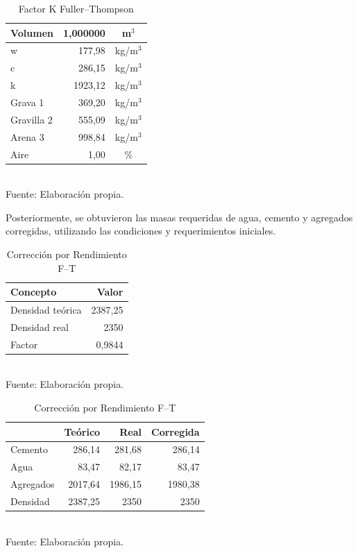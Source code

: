 \begin{table}[H]
\centering
\caption{Factor K Fuller--Thompson}
\label{tab:factor-k-thomson}
\setlength{\tabcolsep}{6pt}
\renewcommand{\arraystretch}{1.15}
\small
\begin{tabular}{|l|r|c|}
\hline
\textbf{Volumen} & \textbf{1,000000} & \textbf{m$^{3}$} \\ \hline
w          & 177,98     & kg/m$^{3}$ \\ \hline
c          & 286,15     & kg/m$^{3}$ \\ \hline
k          & 1923,12    & kg/m$^{3}$ \\ \hline
Grava 1    & 369,20     & kg/m$^{3}$ \\ \hline
Gravilla 2 & 555,09     & kg/m$^{3}$ \\ \hline
Arena 3    & 998,84     & kg/m$^{3}$ \\ \hline
Aire & 1,00 & \% \\ \hline
\end{tabular}
\\ Fuente: Elaboración propia.
\end{table}

Posteriormente, se obtuvieron las masas requeridas de agua, cemento y agregados corregidas, utilizando las
condiciones y requerimientos iniciales.

\begin{table}[H]
\centering
\caption{Rendimiento Fuller-Thompson y factor de densidad}
\label{tab:rendimiento-factor-thomson}
\small
\setlength{\tabcolsep}{6pt}
\renewcommand{\arraystretch}{1.15}
\begin{subtable}[t]{0.38\textwidth}
\centering
\caption{Densidades}
\begin{tabular}{lr}
\toprule
\textbf{Concepto} & \textbf{Valor} \\
\midrule
Densidad teórica & 2387,25 \\
Densidad real    & 2350 \\
Factor           & 0,9844 \\
\bottomrule
\end{tabular}
\\ Fuente: Elaboración propia.
\end{subtable}
\hfill
\begin{subtable}[t]{0.58\textwidth}
\centering
\caption{Corrección por Rendimiento F--T}
\setlength{\tabcolsep}{6pt}
\renewcommand{\arraystretch}{1.15}
\small
\begin{tabular}{lrrr}
\toprule
 & \textbf{Teórico} & \textbf{Real} & \textbf{Corregida} \\
\midrule
Cemento   & 286,14 & 281,68 & 286,14 \\
Agua      & 83,47  & 82,17  & 83,47  \\
Agregados & 2017,64 & 1986,15 & 1980,38 \\
Densidad  & 2387,25 & 2350   & 2350   \\
\bottomrule
\end{tabular}
\\Fuente: Elaboración propia.
\end{subtable}
\end{table}


